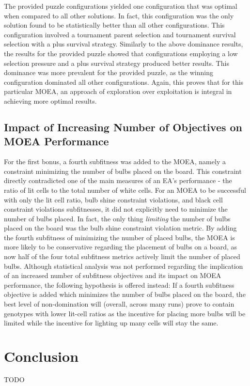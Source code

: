 \documentclass[11pt]{article}
\begin{document}
The provided puzzle configurations yielded one configuration that was optimal when compared 
to all other solutions. In fact,
this configuration was the only solution found to be statistically better than all other 
configurations. This configuration involved
a tournament parent selection and tournament survival selection with a plus survival strategy.
Similarly to the above dominance results, the results for the provided puzzle showed that 
configurations employing a low selection pressure and a plus survival strategy produced better 
results. This dominance was more prevalent for the provided puzzle, as the winning configuration
dominated all other configurations. Again, this proves that for this particular MOEA, an approach
of exploration over exploitation is integral in achieving more optimal results.


\subsection{Impact of Increasing Number of Objectives on MOEA Performance}

For the first bonus, a fourth subfitness was added to the MOEA, namely a constraint minimizing
the number of bulbs placed on the board. This constraint directly contradicted one of the main
measures of an EA's performance - the ratio of lit cells to the total number of white cells.
For an MOEA to be successful with only the lit cell ratio, bulb shine constraint violations, and
black cell constraint violations subfitnesses, it did not explicitly need to minimize the number 
of bulbs
placed. In fact, the only thing \textit{limiting} the number of bulbs placed on the board was the
bulb shine constraint violation metric. By adding the fourth subfitness of minimizing the number
of placed bulbs, the MOEA is more likely to be conservative regarding the placement of bulbs on
a board, as now half of the four total subfitness metrics actively limit the number of placed bulbs.
Although statistical analysis was not performed regarding the implication of an increased number
of subfitness objectives and its impact on MOEA performance, the following hypothesis is offered
instead: If a fourth subfitness objective is added which minimizes the number of bulbs placed
on the board, the best level of non-domination will (overall, across many runs) prove to contain 
genotypes with lower lit-cell ratios as the incentive for placing more bulbs will be limited
while the incentive for lighting up many cells will stay the same.


\section{Conclusion}

TODO
\end{document}
